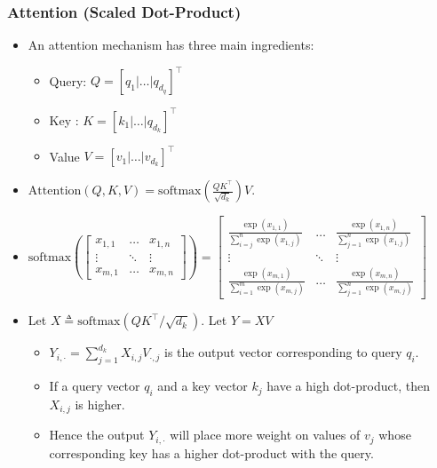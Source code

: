 \documentclass[t]{beamer}
\begin{document}
\begin{frame}
  \frametitle{Attention (Scaled Dot-Product)}
  \begin{itemize}
  \item An attention mechanism has three main ingredients:
    \begin{itemize}
    \item Query: $Q=[q_1 | \dots | q_{d_q}]^\top$
    \item Key : $K=[k_1 | \dots | q_{d_k}]^\top$
      \item Value $V=[v_1 | \dots | v_{d_k}]^\top$
    \end{itemize}
  \item $\mathrm{Attention}(Q, K, V) = \mathrm{softmax} \left( \frac{QK^\top}{\sqrt{d_k}} \right)V$.
  \item $\mathrm{softmax} \left( \begin{bmatrix} x_{1,1} & \dots & x_{1, n} \\ \vdots & \ddots & \vdots \\ x_{m, 1} & \dots & x_{m,n} \end{bmatrix} \right) = \begin{bmatrix} \frac{\exp(x_{1,1})}{\sum_{i=j}^n \exp(x_{1, j})} & \dots & \frac{\exp(x_{1, n})}{\sum_{j=1}^n\exp(x_{1, j})} \\ \vdots & \ddots & \vdots \\ \frac{\exp(x_{m, 1})}{\sum_{i=1}^m \exp(x_{m, j})} & \dots & \frac{\exp(x_{m,n})}{\sum_{j=1}^n \exp(x_{m, j})} \end{bmatrix}$
  \item Let $X \triangleq \mathrm{softmax} (QK^\top / \sqrt {d_k})$. Let $Y = XV$
    \begin{itemize}
    \item $Y_{i, \cdot} = \sum_{j=1}^{d_k} X_{i, j} V_{\cdot, j}$ is the output vector corresponding to query $q_i$.
    \item If a query vector $q_i$ and a key vector $k_j$ have a high dot-product, then $X_{i,j}$ is higher.
    \item Hence the output $Y_{i, \cdot}$ will place more weight on values of $v_j$ whose corresponding key has a higher dot-product with the query.
    \end{itemize}
    \end{itemize}
  \end{frame}
\end{document}

